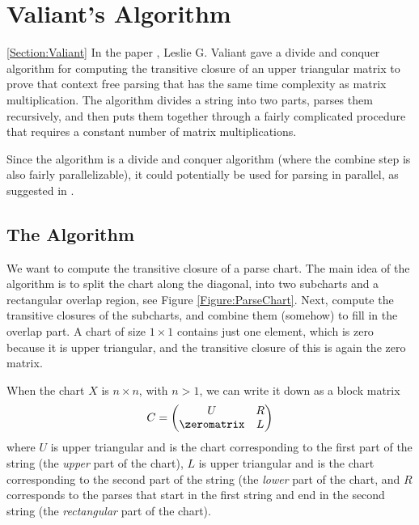 \section{Valiant's Algorithm}
\ref{Section:Valiant}
In the paper \cite{Valiant}, Leslie G. Valiant gave a divide and conquer algorithm for computing the transitive closure of an upper triangular matrix to prove that context free parsing that has the same time complexity as matrix multiplication. The algorithm divides a string into two parts, parses them recursively, and then puts them together through a fairly complicated procedure that requires a constant number of matrix multiplications.

Since the algorithm is a divide and conquer algorithm (where the combine step is also fairly parallelizable), it could potentially be used for parsing in parallel, as suggested in \cite{JP-PP}.

\subsection{The Algorithm} 
We want to compute the transitive closure of a parse chart. The main idea of the algorithm is to split the chart along the diagonal, into two subcharts and a rectangular overlap region, see Figure \ref{Figure:ParseChart}. Next, compute the transitive closures of the subcharts, and combine them (somehow) to fill in the overlap part. A chart of size $1 \times 1$ contains just one element, which is zero because it is upper triangular, and the transitive closure of this is again the zero matrix.

\label{Section:Subdivision-in-Specification}
When the chart $X$ is $n \times n$, with $n > 1$, we can write it down as a block matrix 
\begin{equation*}
  C = 
  \begin{pmatrix}
    U & R \\
    \zeromatrix & L
  \end{pmatrix}
\end{equation*}
where $U$ is upper triangular and is the chart corresponding to the first part of the string (the \emph{upper} part of the chart), $L$ is upper triangular and is the chart corresponding to the second part of the string (the \emph{lower} part of the chart, and $R$ corresponds to the parses that start in the first string and end in the second string (the \emph{rectangular} part of the chart).

